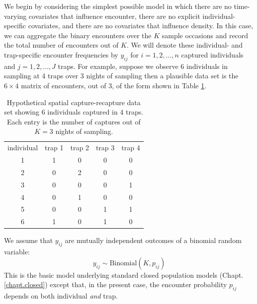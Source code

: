We begin by considering the simplest possible model in which
there are no time-varying covariates that
influence encounter, there are no explicit individual-specific
covariates, and there are no covariates that influence density. In
this case, we can aggregate the binary encounters over
the $K$ sample occasions and record the total number of encounters out
of $K$. We will denote these individual- and trap-specific encounter
frequencies by $y_{ij}$ for $i=1,2,\ldots,n$ captured
individuals and $j=1,2,\ldots,J$ traps.
For example, suppose we observe 6
individuals in sampling at 4 traps over 3 nights of sampling then a
plausible data set is the $6 \times 4$ matrix of encounters, out of 3,
of the form shown in Table \ref{scr0.tab.data}.
\begin{table}
\centering
\caption{Hypothetical spatial capture-recapture data set showing 6
  individuals captured in 4 traps.
Each entry is the number of captures out of
 $K=3$ nights of sampling.
}
\begin{tabular}{ccccc}
individual &  trap 1 & trap 2 & trap 3 & trap 4 \\
1  &   1  &   0  &   0  &   0 \\
2  &   0  &   2  &   0  &   0 \\
3  &   0  &   0  &   0  &   1 \\
4  &   0  &   1  &   0  &   0 \\
5  &   0  &   0  &   1  &   1 \\
6  &   1  &   0  &   1  &   0 \\
\end{tabular}
\label{scr0.tab.data}
\end{table}
We assume that $y_{ij}$ are
 mutually independent outcomes of a binomial random variable:
\begin{equation}
	y_{ij} \sim \mbox{Binomial}(K, p_{ij})
\label{scr0.eq.bin}
\end{equation}
This is the basic model underlying
 standard closed population models
(Chapt. \ref{chapt.closed}) except that, in the present case, the
encounter probability $p_{ij}$ depends on both individual {\it and}
trap.


